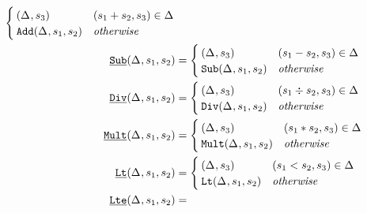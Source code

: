 \begin{align*}
                                 \begin{cases}
                                   \wrappedprimspacer
                                   (\aStore{},s_3) & (s_1 + s_2, s_3) \in \aStore{} \\
                                   \padd(\aStore{},s_1,s_2) & \mathit{otherwise}
                                 \end{cases} \\
\pwrap{\psub}(\aStore{},s_1,s_2) &=
                                \begin{cases}
                                  \wrappedprimspacer
                                  (\aStore{},s_3) & (s_1 - s_2, s_3) \in \aStore{} \\
                                  \psub(\aStore{},s_1,s_2) & \mathit{otherwise}
                                \end{cases} \\
\pwrap{\pdiv}(\aStore{},s_1,s_2) &=
                                 \begin{cases}
                                   \wrappedprimspacer
                                   (\aStore{},s_3) & (s_1 \div s_2, s_3) \in \aStore{} \\
                                   \pdiv(\aStore{},s_1,s_2) & \mathit{otherwise}
                                 \end{cases} \\
  \pwrap{\pmult}(\aStore{},s_1,s_2) &=
                                     \begin{cases}
                                       \wrappedprimspacer
                                       (\aStore{},s_3) & (s_1 * s_2, s_3) \in \aStore{} \\
                                       \pmult(\aStore{},s_1,s_2) & \mathit{otherwise}
                                     \end{cases} \\
  \pwrap{\plt}(\aStore{},s_1,s_2) &=
                                     \begin{cases}
                                       \wrappedprimspacer
                                       (\aStore{},s_3) & (s_1 < s_2, s_3) \in \aStore{} \\
                                       \plt(\aStore{},s_1,s_2) & \mathit{otherwise}
                                     \end{cases} \\
  \pwrap{\plte}(\aStore{},s_1,s_2) &=

\end{align*}
